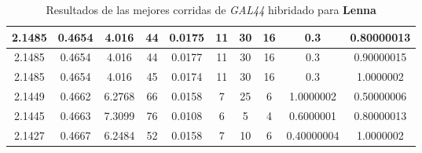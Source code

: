 \begin{table}[h!]
\begin{center}
\begin{tabular}{|c|c|c|c|c|c|c|c|c|c|}
        \hline
        \hline
            2.1485 & 0.4654  & 4.016 & 44 & 0.0175 & 11 & 30 & 16 & 0.3 & 0.80000013\\
        \hline
        \hline
            2.1485 & 0.4654  & 4.016 & 44 & 0.0177 & 11 & 30 & 16 & 0.3 & 0.90000015\\
        \hline
        \hline
            2.1485 & 0.4654  & 4.016 & 45 & 0.0174 & 11 & 30 & 16 & 0.3 & 1.0000002\\
        \hline
        \hline
            2.1449 & 0.4662  & 6.2768 & 66 & 0.0158 & 7 & 25 & 6 & 1.0000002 & 0.50000006\\
        \hline
        \hline
            2.1445 & 0.4663  & 7.3099 & 76 & 0.0108 & 6 & 5 & 4 & 0.6000001 & 0.80000013\\
        \hline
        \hline
            2.1427 & 0.4667  & 6.2484 & 52 & 0.0158 & 7 & 10 & 6 & 0.40000004 & 1.0000002\\
        \hline
        \end{tabular}
        \caption{Resultados de las mejores corridas de \emph{GAL44} hibridado para {\bf Lenna}}
        \label{tb:tableGAL44}
    \end{center}
\end{table}
